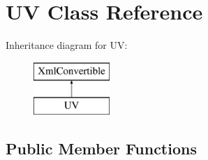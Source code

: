 \hypertarget{classUV}{\section{U\+V Class Reference}
\label{classUV}
}
Inheritance diagram for U\+V\+:\begin{figure}[H]
\begin{center}
\leavevmode
\includegraphics[height=2.000000cm]{classUV}
\end{center}
\end{figure}
\subsection*{Public Member Functions}
